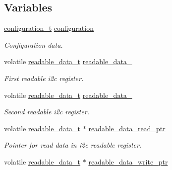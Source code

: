 \subsection*{Variables}
\begin{DoxyCompactItemize}
\item 
\mbox{\label{i2c-rain_8h_a32c97d3f8cd6089ccf54e7c423020b7a}} 
\hyperlink{structconfiguration__t}{configuration\+\_\+t} \hyperlink{i2c-rain_8h_a32c97d3f8cd6089ccf54e7c423020b7a}{configuration}
\begin{DoxyCompactList}\small\item\em Configuration data. \end{DoxyCompactList}\item 
\mbox{\label{i2c-rain_8h_ab7c4666cc43ac73859ace91030494dba}} 
volatile \hyperlink{structreadable__data__t}{readable\+\_\+data\+\_\+t} \hyperlink{i2c-rain_8h_ab7c4666cc43ac73859ace91030494dba}{readable\+\_\+data\+\_}
\begin{DoxyCompactList}\small\item\em First readable i2c register. \end{DoxyCompactList}\item 
\mbox{\label{i2c-rain_8h_af1fd929e13557159958a5328deefd8a3}} 
volatile \hyperlink{structreadable__data__t}{readable\+\_\+data\+\_\+t} \hyperlink{i2c-rain_8h_af1fd929e13557159958a5328deefd8a3}{readable\+\_\+data\+\_}
\begin{DoxyCompactList}\small\item\em Second readable i2c register. \end{DoxyCompactList}\item 
\mbox{\label{i2c-rain_8h_af0914001a8977841586be8312dee3656}} 
volatile \hyperlink{structreadable__data__t}{readable\+\_\+data\+\_\+t} $\ast$ \hyperlink{i2c-rain_8h_af0914001a8977841586be8312dee3656}{readable\+\_\+data\+\_\+read\+\_\+ptr}
\begin{DoxyCompactList}\small\item\em Pointer for read data in i2c readable register. \end{DoxyCompactList}\item 
\mbox{\label{i2c-rain_8h_ab7eec4069b1ac3d682d74b37921e2707}} 
volatile \hyperlink{structreadable__data__t}{readable\+\_\+data\+\_\+t} $\ast$ \hyperlink{i2c-rain_8h_ab7eec4069b1ac3d682d74b37921e2707}{readable\+\_\+data\+\_\+write\+\_\+ptr}

\end{DoxyCompactItemize}
